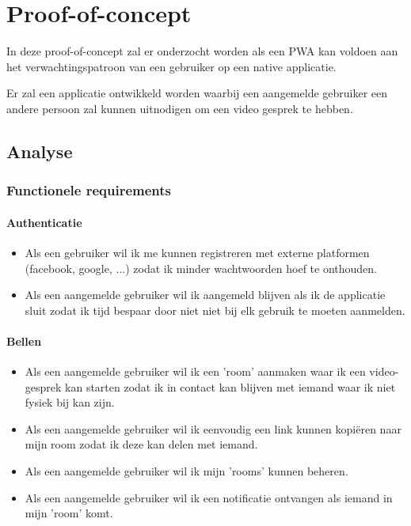 \chapter{Proof-of-concept}
\label{ch:Proof-of-concept}


In deze proof-of-concept zal er onderzocht worden als een PWA kan voldoen aan het verwachtingspatroon van een gebruiker op een native applicatie.

Er zal een applicatie ontwikkeld worden waarbij een aangemelde gebruiker een andere persoon zal kunnen uitnodigen om een video gesprek te hebben. 

 \section{Analyse}
	 \subsection{Functionele requirements}
	 	\subsubsection{Authenticatie}
		 	\begin{itemize}
			 	\item Als een gebruiker wil ik me kunnen registreren met externe platformen (facebook, google, ...) zodat ik minder wachtwoorden hoef te onthouden.
			 	\item Als een aangemelde gebruiker wil ik aangemeld blijven als ik de applicatie sluit zodat ik tijd bespaar door niet niet bij elk gebruik te moeten aanmelden.
		 	\end{itemize}
		 	
		 \subsubsection{Bellen}
			  \begin{itemize}
			   	\item Als een aangemelde gebruiker wil ik een 'room' aanmaken waar ik een video-gesprek kan starten zodat ik in contact kan blijven met iemand waar ik niet fysiek bij kan zijn.
			   	\item Als een aangemelde gebruiker wil ik eenvoudig een link kunnen kopiëren naar mijn room zodat ik deze kan delen met iemand.
			   	\item Als een aangemelde gebruiker wil ik mijn 'rooms' kunnen beheren.
			   	\item Als een aangemelde gebruiker wil ik een notificatie ontvangen als iemand in mijn 'room' komt.
			  \end{itemize}
	 	
